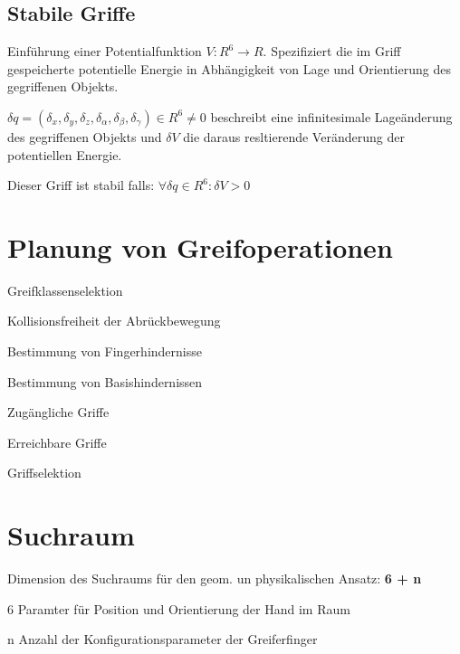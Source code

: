 \subsection{Stabile Griffe}
\begin{compactitem}
    \item Einführung einer Potentialfunktion $V: R^6 \rightarrow R$. Spezifiziert die im Griff gespeicherte
    potentielle Energie in Abhängigkeit von Lage und Orientierung des gegriffenen Objekts.
    \item $\delta q= (\delta_x, \delta_y, \delta_z, \delta_\alpha, \delta_\beta, \delta_\gamma) \in
    R^6 \neq 0$ beschreibt eine infinitesimale Lageänderung des gegriffenen Objekts und $\delta V$ die daraus
    resltierende Veränderung der potentiellen Energie.
    \item Dieser Griff ist stabil falls: $\forall \delta q \in R^6: \delta V > 0$
\end{compactitem}
\section{Planung von Greifoperationen}
\begin{compactenum}
    \item Greifklassenselektion
    \item Kollisionsfreiheit der Abrückbewegung
    \item Bestimmung von Fingerhindernisse
    \item Bestimmung von Basishindernissen
    \item Zugängliche Griffe
    \item Erreichbare Griffe
    \item Griffselektion
\end{compactenum}
\section{Suchraum}
Dimension des Suchraums für den geom. un physikalischen Ansatz: \textbf{6 + n}
\begin{compactitem}
    \item 6 Paramter für Position und Orientierung der Hand im Raum
    \item n Anzahl der Konfigurationsparameter der Greiferfinger
\end{compactitem}
